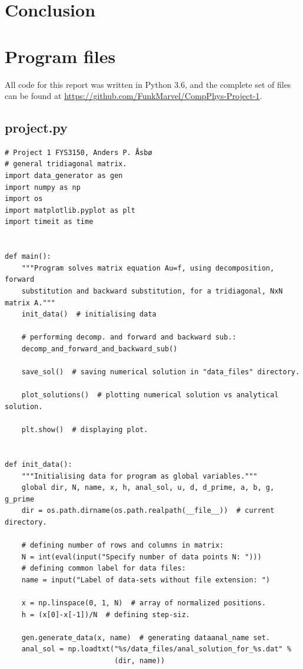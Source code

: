 \documentclass[english,notitlepage,reprint]{revtex4-1}  %
\begin{document}
\section{Conclusion}\label{sec:5}

\newpage
\onecolumngrid
\appendix
\section{Program files} \label{A}
All code for this report was written in Python 3.6, and the complete set of files can be found at \url{https://github.com/FunkMarvel/CompPhys-Project-1}.
\subsection{project.py}\label{A:1}
\begin{lstlisting}
# Project 1 FYS3150, Anders P. Åsbø
# general tridiagonal matrix.
import data_generator as gen
import numpy as np
import os
import matplotlib.pyplot as plt
import timeit as time


def main():
    """Program solves matrix equation Au=f, using decomposition, forward
    substitution and backward substitution, for a tridiagonal, NxN matrix A."""
    init_data()  # initialising data

    # performing decomp. and forward and backward sub.:
    decomp_and_forward_and_backward_sub()

    save_sol()  # saving numerical solution in "data_files" directory.

    plot_solutions()  # plotting numerical solution vs analytical solution.

    plt.show()  # displaying plot.


def init_data():
    """Initialising data for program as global variables."""
    global dir, N, name, x, h, anal_sol, u, d, d_prime, a, b, g, g_prime
    dir = os.path.dirname(os.path.realpath(__file__))  # current directory.

    # defining number of rows and columns in matrix:
    N = int(eval(input("Specify number of data points N: ")))
    # defining common label for data files:
    name = input("Label of data-sets without file extension: ")

    x = np.linspace(0, 1, N)  # array of normalized positions.
    h = (x[0]-x[-1])/N  # defining step-siz.

    gen.generate_data(x, name)  # generating dataanal_name set.
    anal_sol = np.loadtxt("%s/data_files/anal_solution_for_%s.dat" %
                          (dir, name))


\end{lstlisting}
\end{document}
